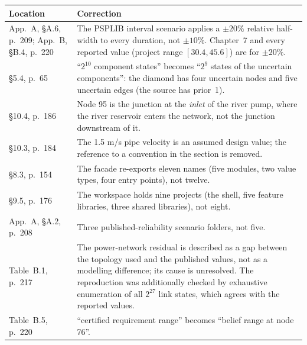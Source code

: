 \documentclass[11pt]{article}
\begin{document}
\begin{tabularx}{\linewidth}{@{}P{3.4cm}L@{}}
\toprule
Location & Correction \\
\midrule
App.~A, \S A.6, p.~209; App.~B, \S B.4, p.~220 & The PSPLIB interval scenario applies a
$\pm 20\%$ relative half-width to every duration, not $\pm 10\%$. Chapter~7 and every reported
value (project range $[30.4, 45.6]$) are for $\pm 20\%$. \\
\S5.4, p.~65 & ``$2^{10}$ component states'' becomes ``$2^{9}$ states of the uncertain
components'': the diamond has four uncertain nodes and five uncertain edges (the source has
prior~1). \\
\S10.4, p.~186 & Node 95 is the junction at the \emph{inlet} of the river pump, where the
river reservoir enters the network, not the junction downstream of it. \\
\S10.3, p.~184 & The 1.5 m/s pipe velocity is an assumed design value; the reference to a
convention in the section is removed. \\
\S8.3, p.~154 & The facade re-exports eleven names (five modules, two value types, four entry
points), not twelve. \\
\S9.5, p.~176 & The workspace holds nine projects (the shell, five feature libraries, three
shared libraries), not eight. \\
App.~A, \S A.2, p.~208 & Three published-reliability scenario folders, not five. \\
Table~B.1, p.~217 & The power-network residual is described as a gap between the topology
used and the published values, not as a modelling difference; its cause is unresolved. The
reproduction was additionally checked by exhaustive enumeration of all $2^{27}$ link states,
which agrees with the reported values. \\
Table~B.5, p.~220 & ``certified requirement range'' becomes ``belief range at node 76''. \\
\bottomrule
\end{tabularx}
\end{document}
